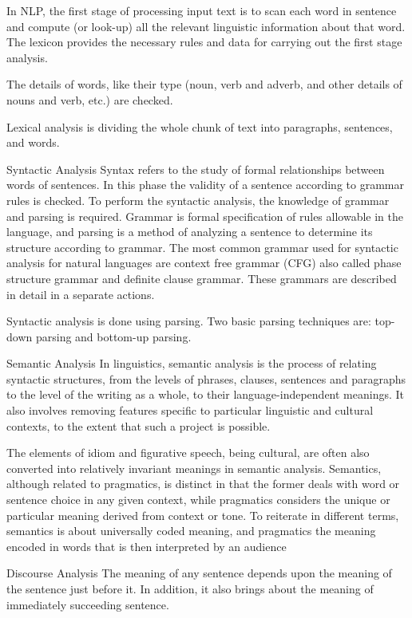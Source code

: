 In NLP, the first stage of processing input text is to scan each word in sentence and compute (or look-up) all the relevant linguistic information about that word. The lexicon provides the necessary rules and data for carrying out the first stage analysis.

The details of words, like their type (noun, verb and adverb, and other details of nouns and verb, etc.) are checked.



Lexical analysis is dividing the whole chunk of text into paragraphs, sentences, and words.

Syntactic Analysis
Syntax refers to the study of formal relationships between words of sentences. In this phase the validity of a sentence according to grammar rules is checked. To perform the syntactic analysis, the knowledge of grammar and parsing is required. Grammar is formal specification of rules allowable in the language, and parsing is a method of analyzing a sentence to determine its structure according to grammar. The most common grammar used for syntactic analysis for natural languages are context free grammar (CFG) also called phase structure grammar and definite clause grammar. These grammars are described in detail in a separate actions.



Syntactic analysis is done using parsing. Two basic parsing techniques are: top-down parsing and bottom-up parsing.

Semantic Analysis
In linguistics, semantic analysis is the process of relating syntactic structures, from the levels of phrases, clauses, sentences and paragraphs to the level of the writing as a whole, to their language-independent meanings. It also involves removing features specific to particular linguistic and cultural contexts, to the extent that such a project is possible.

The elements of idiom and figurative speech, being cultural, are often also converted into relatively invariant meanings in semantic analysis. Semantics, although related to pragmatics, is distinct in that the former deals with word or sentence choice in any given context, while pragmatics considers the unique or particular meaning derived from context or tone. To reiterate in different terms, semantics is about universally coded meaning, and pragmatics the meaning encoded in words that is then interpreted by an audience

Discourse Analysis
The meaning of any sentence depends upon the meaning of the sentence just before it. In addition, it also brings about the meaning of immediately succeeding sentence.

